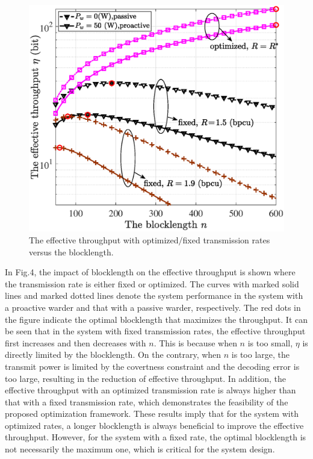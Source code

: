 \documentclass[conference]{IEEEtran}
\begin{document}
\begin{figure}
	\centering
	\includegraphics[width=0.85\linewidth]{figure/figure3.eps}
	\caption{The effective throughput with optimized$/$fixed transmission rates versus the blocklength.}
	\label{fig_sim}
\end{figure}
In Fig.4, the impact of blocklength on the effective throughput is shown where the transmission rate is either fixed or optimized. The curves with marked solid lines and marked dotted lines denote the system performance in the system with a proactive warder and that with a passive warder, respectively. The red dots in the figure indicate the optimal blocklength that maximizes the throughput. It can be seen that in the system with fixed transmission rates, the effective throughput first increases and then decreases with $n$. This is because when $n$ is too small, $\eta$ is directly limited by the blocklength. On the contrary, when $n$ is too large, the transmit power is limited by the covertness constraint and the decoding error is too large, resulting in the reduction of effective throughput.  In addition, the effective throughput with an optimized transmission rate is always higher than that with a fixed transmission rate,  which demonstrates the feasibility of the proposed optimization framework. These results imply that for the system with optimized rates, a longer blocklength is always beneficial to improve the effective throughput. However, for the system with a fixed rate, the optimal blocklength is not necessarily the maximum one, which is critical for the system design.
\end{document}
